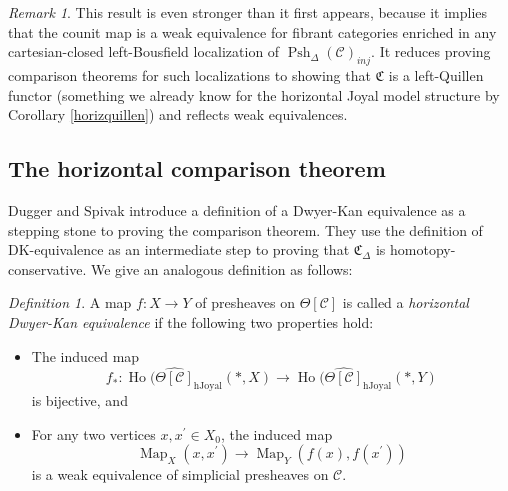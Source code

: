 \documentclass[leqno]{article}
\numberwithin{equation}{subsection}
\theoremstyle{plain}   %
\theoremstyle{remark}
\newtheorem{rem}[equation]{Remark}
\newtheorem{defn}[equation]{Definition}
\theoremstyle{plain}
\DeclareMathOperator{\Map}{Map}
\renewcommand{\C}{\ensuremath{\mathcal{C}}}
\newcommand{\cellset}{\ensuremath{\widehat{\Theta[\mathcal{C}]}}}
\newcommand{\spsh}{\ensuremath{\operatorname{Psh}_\Delta(\mathcal{C})}}
\begin{document}
\begin{rem}
	This result is even stronger than it first appears, because it implies that the counit map is a weak equivalence for fibrant categories enriched in any cartesian-closed left-Bousfield localization of \(\spsh_{inj}\).  It reduces proving comparison theorems for such localizations to showing that \(\mathfrak{C}\) is a left-Quillen functor (something we already know for the horizontal Joyal model structure by Corollary \ref{horizquillen}) and reflects weak equivalences.
\end{rem}

\subsection{The horizontal comparison theorem}\label{horizcomparison}
Dugger and Spivak introduce a definition of a Dwyer-Kan equivalence as a stepping stone to proving the comparison theorem.  They use the definition of DK-equivalence as an intermediate step to proving that \(\mathfrak{C}_\Delta\) is homotopy-conservative.  We give an analogous definition as follows:

\begin{defn}
  A map \(f:X\to Y\) of presheaves on \(\Theta[\C]\) is called a \emph{horizontal Dwyer-Kan equivalence} if the following two properties hold:
	\begin{itemize}
		\item The induced map
		      \[f_*:\operatorname{Ho}(\cellset_{\mathrm{hJoyal}}(\ast,X) \to \operatorname{Ho}(\cellset_{\mathrm{hJoyal}}(\ast,Y)\]
		      is bijective, and
		\item For any two vertices \(x,x^\prime\in X_0\), the induced map
		      \[\Map_X(x,x^\prime) \to \Map_Y(f(x),f(x^\prime))\]
		      is a weak equivalence of simplicial presheaves on \(\C\).
	\end{itemize}
\end{defn}
\end{document}
